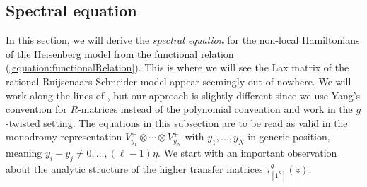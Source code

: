 \documentclass[11pt]{report}
\theoremstyle{definition}
\theoremstyle{remark}
\theoremstyle{remark}
\begin{document}
%

\subsection{Spectral equation}

In this section, we will derive the \emph{spectral equation} for the non-local Hamiltonians of the Heisenberg model from the functional relation (\ref{equation:functionalRelation}). This is where we will see the Lax matrix of the rational Ruijsenaars-Schneider model appear seemingly out of nowhere. We will work along the lines of \cite{book:arutyunov:betheAnsatz}, but our approach is slightly different since we use Yang's convention for $R$-matrices instead of the polynomial convention and work in the $g$-twisted setting. The equations in this subsection are to be read as valid in the monodromy representation $V_{y_1}^+ \otimes \cdots \otimes V_{y_N}^+$ with $y_1,...,y_N$ in generic position, meaning $y_i-y_j \neq 0,...,(\ell-1)\eta$. We start with an important observation about the analytic structure of the higher transfer matrices $\tau_{[1^k]}^g(z)$:
\end{document}
